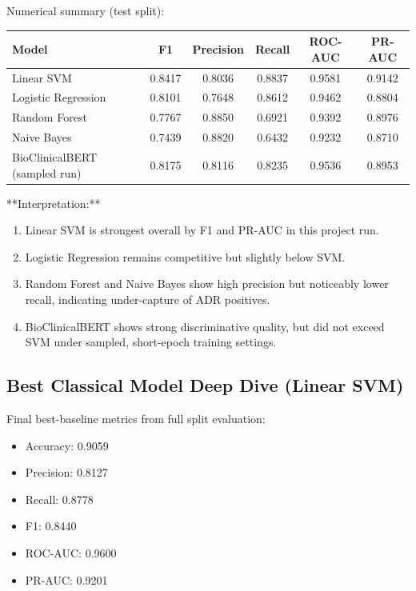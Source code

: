 \documentclass[11pt]{article}
\begin{document}
Numerical summary (test split):


\begin{table}[H]
\centering
\begin{tabular}{lccccc}
\toprule
Model & F1 & Precision & Recall & ROC-AUC & PR-AUC \\
\midrule
Linear SVM & 0.8417 & 0.8036 & 0.8837 & 0.9581 & 0.9142 \\
Logistic Regression & 0.8101 & 0.7648 & 0.8612 & 0.9462 & 0.8804 \\
Random Forest & 0.7767 & 0.8850 & 0.6921 & 0.9392 & 0.8976 \\
Naive Bayes & 0.7439 & 0.8820 & 0.6432 & 0.9232 & 0.8710 \\
BioClinicalBERT (sampled run) & 0.8175 & 0.8116 & 0.8235 & 0.9536 & 0.8953 \\
\bottomrule
\end{tabular}
\end{table}


**Interpretation:**


\begin{enumerate}
  \item Linear SVM is strongest overall by F1 and PR-AUC in this project run.
  \item Logistic Regression remains competitive but slightly below SVM.
  \item Random Forest and Naive Bayes show high precision but noticeably lower recall, indicating under-capture of ADR positives.
  \item BioClinicalBERT shows strong discriminative quality, but did not exceed SVM under sampled, short-epoch training settings.
\end{enumerate}

\subsection{Best Classical Model Deep Dive (Linear SVM)}

Final best-baseline metrics from full split evaluation:


\begin{itemize}
  \item Accuracy: 0.9059
  \item Precision: 0.8127
  \item Recall: 0.8778
  \item F1: 0.8440
  \item ROC-AUC: 0.9600
  \item PR-AUC: 0.9201
\end{itemize}
\end{document}
